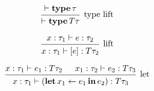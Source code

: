\documentclass[12pt]{article}
\begin{document}
\pagestyle{empty}

\[
  \begin{prooftree}
    \hypo{\vdash \mathop{\mathbf{type}} \tau}
    \infer1[type lift]{\vdash \mathop{\mathbf{type}} T \tau}
  \end{prooftree}
\]

\[
  \begin{prooftree}
    \hypo{x: \tau_1 \vdash e: \tau_2}
    \infer1[lift]{x: \tau_1 \vdash [e]: T \tau_2}
  \end{prooftree}
\]

\[
  \begin{prooftree}
    \hypo{x: \tau_1 \vdash e_1: T \tau_2}
    \hypo{x_1: \tau_2 \vdash e_2: T \tau_3}
    \infer2[let]{x: \tau_1 \vdash (\mathop{\mathbf{let}} x_1 \gets e_1 \mathop{\mathbf{in}} e_2): T \tau_3}
  \end{prooftree}
\]
\end{document}
